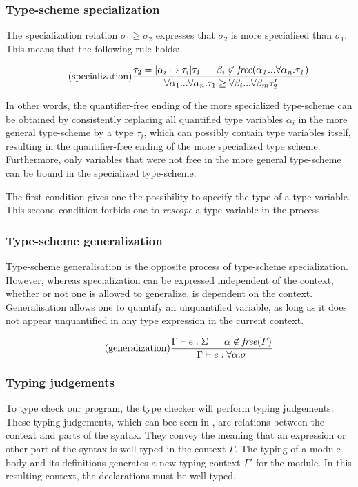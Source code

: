 \documentclass[10pt,a4paper,master=cws, masteroption=ai,english,inputenc=utf8]{kulemt}
\begin{document}
\subsubsection{Type-scheme specialization}
The specialization relation $\sigma_{1} \geq \sigma_{2}$ expresses that $\sigma_{2}$ is more specialised than $\sigma_{1}$. This means that the following rule holds:
%

\[
\tag{specialization}
\frac{\tau_{2}=[\alpha_{i} \mapsto \tau_{i}]\tau_{1} \;\;\;\;\;\; \beta_{i} \not\in\mathit{free(\alpha_{1}...\forall \alpha_{n}.\tau_{1})}}
{\forall\alpha_{1}...\forall\alpha_{n}.\tau_{1}\geq \forall \beta_{i}...\forall \beta_{m}\tau_{2}'}
\]

In other words, the quantifier-free ending of the more specialized type-scheme can be obtained by consistently replacing all quantified type variables $\alpha_{i}$ in the more general type-scheme by a type $\tau_{i}$, which can possibly contain type variables itself, resulting in the quantifier-free ending of the more specialized type scheme. Furthermore, only variables that were not free in the more general type-scheme can be bound in the specialized type-scheme.

The first condition gives one the possibility to specify the type of a type variable. This second condition forbids one to \emph{rescope} a type variable in the process.

\subsubsection{Type-scheme generalization}
Type-scheme generalisation is the opposite process of type-scheme specialization. However, whereas specialization can be expressed independent of the context, whether or not one is allowed to generalize, is dependent on the context. Generalisation allows one to quantify an unquantified variable, as long as it does not appear unquantified in any type expression in the current context.

\[
\tag{generalization}
\frac{\Gamma \vdash e:\Sigma \;\;\;\;\;\; \alpha \not\in \mathit{free(\Gamma)}}{\Gamma \vdash e : \forall \alpha . \sigma}
\]


\subsubsection{Typing judgements}
To type check our program, the type checker will perform typing judgements. These typing judgements, which can bee seen in , are relations between the context and parts of the syntax. They convey the meaning that an expression or other part of the syntax is well-typed in the context $\Gamma$. The typing of a module body and its definitions generates a new typing context $\Gamma'$ for the module. In this resulting context, the declarations must be well-typed.
\end{document}
